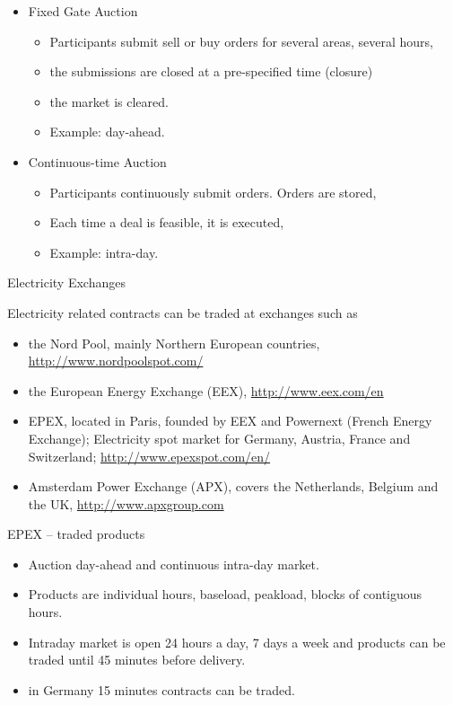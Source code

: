 \begin{itemize}
\item<1-> Fixed Gate Auction
\begin{itemize}
\item Participants submit sell or buy orders for several areas, several hours,
\item the submissions are closed at a pre-specified time (closure)
\item the market is cleared.
\item Example: day-ahead.
\end{itemize}
\item<2-> Continuous-time Auction
\begin{itemize}
\item Participants continuously submit orders. Orders are stored,
\item Each time a deal is feasible, it is executed,
\item Example: intra-day.
\end{itemize}

\end{itemize}




{Electricity Exchanges}

Electricity related contracts  can be traded at exchanges such as
\begin{itemize}
\item<1-> the Nord Pool, mainly Northern European countries, \url{http://www.nordpoolspot.com/}
\item<2-> the European Energy Exchange (EEX), \url{http://www.eex.com/en}
\item<3-> EPEX, located in Paris, founded by EEX and Powernext (French Energy Exchange);
Electricity spot market for Germany, Austria, France and Switzerland;
\url{http://www.epexspot.com/en/}
\item<4-> Amsterdam Power Exchange (APX), covers the Netherlands, Belgium and the UK, \url{http://www.apxgroup.com}
\end{itemize}



{EPEX -- traded products}
\begin{itemize}
\item<1-> Auction day-ahead and continuous intra-day market.
\item<2-> Products are individual hours, baseload, peakload, blocks of contiguous hours.
\item<3-> Intraday market is open 24 hours a day, 7 days a week and products can be traded until 45 minutes before delivery.
\item<4-> in Germany 15 minutes contracts can be traded.
\end{itemize}



